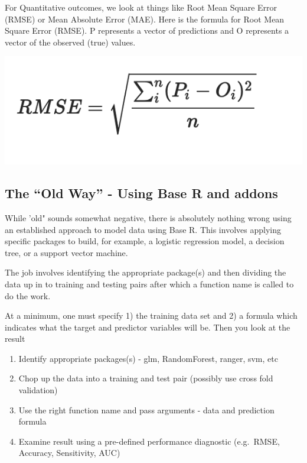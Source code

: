 \documentclass[
]{article}
\providecommand{\tightlist}{%
  \setlength{\itemsep}{0pt}\setlength{\parskip}{0pt}}
\begin{document}
For Quantitative outcomes, we look at things like Root Mean Square Error
(RMSE) or Mean Absolute Error (MAE). Here is the formula for Root Mean
Square Error (RMSE). P represents a vector of predictions and O
represents a vector of the observed (true) values.

\includegraphics{./IMG/rmse.png}

\hypertarget{the-old-way---using-base-r-and-addons}{%
\subsection{The ``Old Way'' - Using Base R and
addons}\label{the-old-way---using-base-r-and-addons}}

While 'old" sounds somewhat negative, there is absolutely nothing wrong
using an established approach to model data using Base R. This involves
applying specific packages to build, for example, a logistic regression
model, a decision tree, or a support vector machine.

The job involves identifying the appropriate package(s) and then
dividing the data up in to training and testing pairs after which a
function name is called to do the work.

At a minimum, one must specify 1) the training data set and 2) a formula
which indicates what the target and predictor variables will be. Then
you look at the result

\begin{enumerate}
\def\labelenumi{\arabic{enumi})}
\tightlist
\item
  Identify appropriate packages(s) - glm, RandomForest, ranger, svm, etc
\item
  Chop up the data into a training and test pair (possibly use cross
  fold validation)
\item
  Use the right function name and pass arguments - data and prediction
  formula
\item
  Examine result using a pre-defined performance diagnostic (e.g.~RMSE,
  Accuracy, Sensitivity, AUC)
\end{enumerate}
\end{document}
